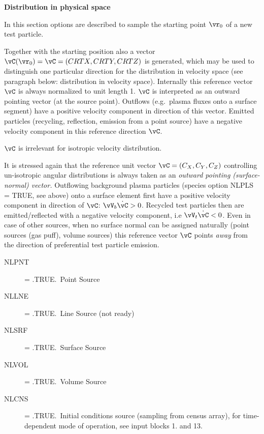 \medskip

\textbf{Distribution in physical space} 

\medskip 

In this section options are described to sample the starting point $\vr_0$ of a
new test particle.

Together with the starting position also a vector $\vC(\vr_0) = \vC =
  (CRTX,CRTY,CRTZ)$ is generated, which may be used to distinguish one particular
direction for the distribution in velocity space (see paragraph below:
distribution in velocity space).
Internally this reference vector $\vC$ is always normalized to unit length 1.
$\vC$ is interpreted as an outward pointing vector (at the source point).
Outflows (e.g.\ plasma fluxes onto a surface segment) have a positive velocity
component in direction of this vector.
Emitted particles (recycling, reflection, emission from a point source) have a
negative velocity component in this reference direction $\vC$.

$\vC$ is irrelevant for isotropic velocity distribution.

It is stressed again that the reference unit vector $\vC = (C_X,C_Y,C_Z)$
controlling un-isotropic angular distributions is always taken as an
\emph{outward pointing (surface-normal) vector.
}
Outflowing background plasma particles (species option NLPLS = TRUE, see above)
onto a surface element first have a positive velocity component in direction of
$\vC$:	$\vV_b \dot \vC > 0$.
Recycled test particles then are emitted/reflected with a negative velocity
component, i.e	    $\vV_t \dot \vC < 0$.
Even in case of other sources, when no surface normal can be assigned naturally
(point sources (gas puff), volume sources) this reference vector $\vC$ points
\emph{away} from the direction of preferential test particle emission.

\begin{description}
  \item[NLPNT] = .TRUE.\ Point Source
  \item[NLLNE] = .TRUE.\ Line Source	(not
        ready)
  \item[NLSRF] = .TRUE.\ Surface Source
  \item[NLVOL] = .TRUE.\ Volume
        Source
  \item[NLCNS] = .TRUE.\ Initial conditions source (sampling from census
        array), for time-depen\-dent mode of operation, see input blocks 1.
        and 13.
\end{description}

